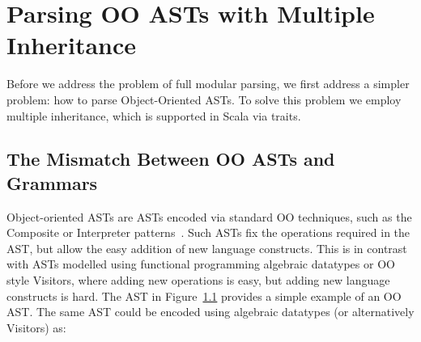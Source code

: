 \begin{comment}
Basically, \name consists of four parts: underlying parsing technique, delegation mechanism encoded by open recursion, Object Algebras, and glue code of new combinators and utility functions. We start from Section \ref{subsec:overview-parsing}, which discusses the choice of parsing technique and how it affects modularity of parsers. Section \ref{subsec:overview-problem} demonstrates the goal of extending parsers together with ASTs in a semantic modular way, with both separate compilation and type-safe code reuse. Then we will see traditional parser combinators fail to achieve it because of hard-coded recursive calls. In Section \ref{subsec:overview-delegation}, we show how delegation can solve this problem and allow us to build extensible parsers. Finally, Section \ref{subsec:overview-oa} gives examples of using Object Algebras for more extensibility, including extension of operations and parsing multiple sorts of syntax.\haoyuan{TODO}
\end{comment}

\begin{comment}
It is worth mentioning that the choice of parser combinators will not
affect the other parts of our library. One can choose other parser
combinators like Parsec, in cases that the performance and supporting
of left-recursion are not major concerns. A different library can even build a new
\name with fancy features or higher efficiency.
\end{comment}


\section{Parsing OO ASTs with Multiple Inheritance}\label{sec:inheritance}

Before we address the problem of full modular parsing, we first
address a simpler problem: how to parse Object-Oriented ASTs. To solve
this problem we employ multiple inheritance, which is supported in
Scala via traits.

\subsection{The Mismatch Between OO ASTs and Grammars}
Object-oriented ASTs are ASTs encoded via standard OO techniques,
such as the {\sc Composite} or {\sc Interpreter} patterns~\cite{gamma94design}. Such ASTs
fix the operations required in the AST, but allow the easy addition of new
language constructs. This is in contrast with ASTs modelled using
functional programming algebraic datatypes or OO style Visitors, where
adding new operations is easy, but adding new language constructs is hard.
The AST in Figure~\ref{} provides a simple example of an OO AST. The same
AST could be encoded using algebraic datatypes (or alternatively Visitors)
as:

